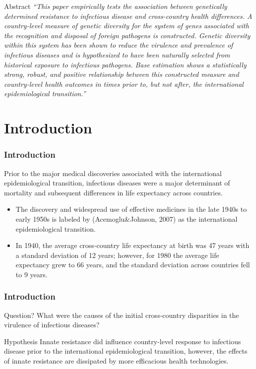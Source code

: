 \documentclass[pdftex,12pt,xcolor=pdftex,table]{beamer}
\theoremstyle{definition}
\theoremstyle{remark}
\numberwithin{equation}{section}
\numberwithin{figure}{section}
\begin{document}
\begin{frame}{Abstract}
\justifying
 \textit{“This paper empirically tests the association between genetically determined resistance to infectious disease and cross-country health differences. A country-level measure of genetic diversity for the system of genes associated with the recognition and disposal of foreign pathogens is constructed. Genetic diversity within this system has been shown to reduce the virulence and prevalence of infectious diseases and is hypothesized to have been naturally selected from historical exposure to infectious pathogens. Base estimation shows a statistically strong, robust, and positive relationship between this constructed measure and country-level health outcomes in times prior to, but not after, the international epidemiological transition.”}
 
\end{frame}
\section{Introduction}
\begin{frame}
\frametitle{Introduction}
    \justifying
    Prior to the major medical discoveries associated with the international epidemiological transition, infectious diseases were a major determinant of mortality and subsequent differences in life expectancy across countries. 
\justifying
\pause
\begin{itemize}

    \item The discovery and widespread use of effective medicines in the late 1940s to early 1950s is labeled by (Acemoglu\&Johnson, 2007)\cite{acemoglu2007disease} as the international epidemiological transition.
    \pause
    \item In 1940, the average cross-country life expectancy at birth was 47 years with a standard deviation of 12 years; however, for 1980 the average life expectancy grew to 66 years, and the standard deviation across countries fell to 9 years. 

\end{itemize}

\end{frame}

\begin{frame}
\frametitle{Introduction}
\justifying
  \begin{block}{Question?}
What were the causes of the initial cross-country disparities in the virulence of infectious diseases?
\end{block}
\pause
\begin{block}{Hypothesis}
Innate resistance did influence country-level response to infectious disease prior to the international epidemiological transition, however, the effects of innate resistance are dissipated by more efficacious health technologies.

\end{block}
\end{frame}
\end{document}
